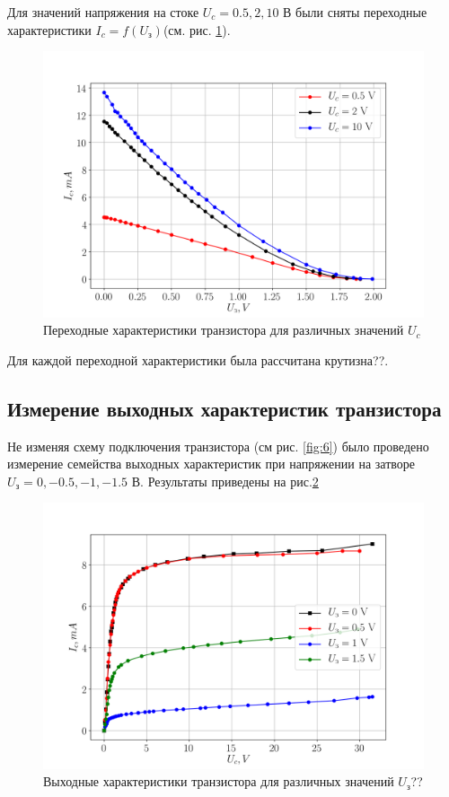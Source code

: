 Для значений напряжения на стоке $U_c = 0.5,2,10$ В были сняты переходные характеристики $I_c = f(U_{\text{з}})$(см.
рис. \ref{fig:7}). 
\begin{figure}[h!]
	\centering
	\includegraphics[width=0.7\linewidth]{fig/task1.png}
	\caption{Переходные характеристики транзистора для различных значений $U_c$}
	\label{fig:7}
\end{figure}

Для каждой переходной характеристики была рассчитана крутизна??.

\subsection{Измерение выходных характеристик транзистора}
Не изменяя схему подключения транзистора (см рис. \ref{fig:6}) было проведено измерение семейства выходных характеристик
при напряжении на затворе $U_{\text{з}} = 0,-0.5,-1,-1.5$ В. Результаты приведены на рис.\ref{fig:8}

\begin{figure}[h!]
	\centering
	\includegraphics[width=0.7\linewidth]{fig/task2.png}
	\caption{Выходные характеристики транзистора для различных значений $U_{\text{з}}$??}
	\label{fig:8}
\end{figure}

